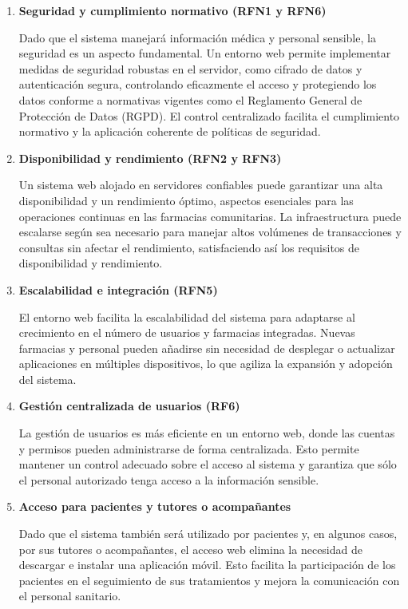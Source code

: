 \begin{enumerate}
	\item \textbf{Seguridad y cumplimiento normativo (RFN1 y RFN6)}
	
	Dado que el sistema manejará información médica y personal sensible, la seguridad es un aspecto fundamental. Un entorno web permite implementar medidas de seguridad robustas en el servidor, como cifrado de datos y autenticación segura, controlando eficazmente el acceso y protegiendo los datos conforme a normativas vigentes como el Reglamento General de Protección de Datos (RGPD). El control centralizado facilita el cumplimiento normativo y la aplicación coherente de políticas de seguridad.
	
	\item \textbf{Disponibilidad y rendimiento (RFN2 y RFN3)}
	
	Un sistema web alojado en servidores confiables puede garantizar una alta disponibilidad y un rendimiento óptimo, aspectos esenciales para las operaciones continuas en las farmacias comunitarias. La infraestructura puede escalarse según sea necesario para manejar altos volúmenes de transacciones y consultas sin afectar el rendimiento, satisfaciendo así los requisitos de disponibilidad y rendimiento.
	
	\item \textbf{Escalabilidad e integración (RFN5)}
	
	El entorno web facilita la escalabilidad del sistema para adaptarse al crecimiento en el número de usuarios y farmacias integradas. Nuevas farmacias y personal pueden añadirse sin necesidad de desplegar o actualizar aplicaciones en múltiples dispositivos, lo que agiliza la expansión y adopción del sistema.
	
	\item \textbf{Gestión centralizada de usuarios (RF6)}
	
	La gestión de usuarios es más eficiente en un entorno web, donde las cuentas y permisos pueden administrarse de forma centralizada. Esto permite mantener un control adecuado sobre el acceso al sistema y garantiza que sólo el personal autorizado tenga acceso a la información sensible.
	
	\item \textbf{Acceso para pacientes y tutores o acompañantes}
	
	Dado que el sistema también será utilizado por pacientes y, en algunos casos, por sus tutores o acompañantes, el acceso web elimina la necesidad de descargar e instalar una aplicación móvil. Esto facilita la participación de los pacientes en el seguimiento de sus tratamientos y mejora la comunicación con el personal sanitario.
	

\end{enumerate}
